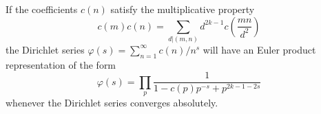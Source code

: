 If the coefficients $c(n)$ satisfy the multiplicative property
$$c(m)c(n) = \sum_{d|(m,n)} d^{2k-1}c\left(\frac{mn}{d^2}\right)$$
the Dirichlet series $\varphi(s) = \sum_{n=1}^{\infty} c(n)/n^s$ will have an Euler product representation of the form
$$\varphi(s) = \prod_p \frac{1}{1 - c(p)p^{-s} + p^{2k-1-2s}}$$
whenever the Dirichlet series converges absolutely.
